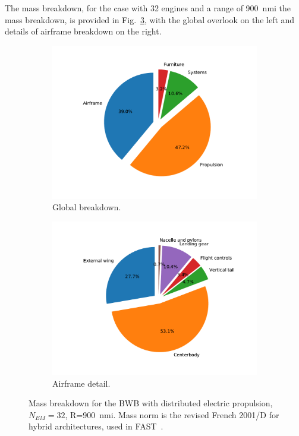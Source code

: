The mass breakdown, for the case with 32 engines and a range of 900~nmi the mass breakdown, is provided in Fig.~\ref{fig:bwb_hybrid_dep_mb}, with the global overlook on the left and details of airframe breakdown on the right.
\begin{figure}[!h]
	\centering
	\begin{subfigure}{0.45\textwidth}
		\centering
		\includegraphics[keepaspectratio, width=\linewidth]{images/chap4/bwb_hybrid_dep_mb}
		\caption{Global breakdown.}
		\label{fig:bwb_hybrid_dep_mb_global}
	\end{subfigure}
	\begin{subfigure}{0.45\textwidth}
		\centering
		\includegraphics[keepaspectratio, width=\linewidth]{images/chap4/bwb_hybrid_dep_airframe_mb}
		\caption{Airframe detail.}
		\label{fig:bwb_hybrid_dep_mb_detail_airframe}
	\end{subfigure}
	\caption{Mass breakdown for the BWB with distributed electric propulsion, $N_{EM}=32$, R=900~nmi. Mass norm is the revised French 2001/D for hybrid architectures, used in FAST~\cite{bib:mass_breakdown}.}
	\label{fig:bwb_hybrid_dep_mb}
\end{figure}
